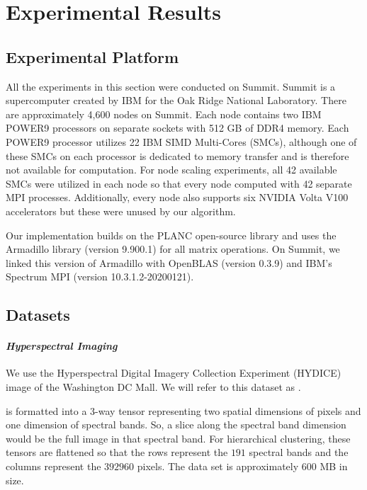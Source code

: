 
\section{Experimental Results}
\label{sec:results}

\subsection{Experimental Platform}
\label{sec:summit}

All the experiments in this section were conducted on Summit. Summit is a supercomputer created by IBM for the Oak Ridge National Laboratory. 
There are approximately 4,600 nodes on Summit. 
Each node contains two IBM POWER9 processors on separate sockets with 512 GB of DDR4 memory.
Each POWER9 processor utilizes 22 IBM SIMD Multi-Cores (SMCs), although one of these SMCs on each processor is dedicated to memory transfer and is therefore not available for computation. 
For node scaling experiments, all 42 available SMCs were utilized in each node so that every node computed with 42 separate MPI processes.
Additionally, every node also supports six NVIDIA Volta V100 accelerators but these were unused by our algorithm. 

Our implementation builds on the PLANC open-source library \cite{EH+19-TR} and uses the Armadillo library (version 9.900.1) for all matrix operations. 
On Summit, we linked this version of Armadillo with OpenBLAS (version 0.3.9) and IBM's Spectrum MPI (version 10.3.1.2-20200121).

\subsection{Datasets}

\paragraph{\emph{Hyperspectral Imaging}}

	We use the Hyperspectral Digital Imagery Collection Experiment (HYDICE) image of the Washington DC Mall. We will refer
	to this dataset as \hyper{}\cite{DC-HYDICE}.
	
	\hyper{} is formatted into a 3-way tensor representing two spatial dimensions of pixels and one dimension of spectral bands. So, a slice along
	the spectral band dimension would be the full \hyper{} image in that spectral band. For hierarchical clustering, these tensors are flattened so that the rows represent the
	$191$ spectral bands and the columns represent the $392960$ pixels.   The data set is approximately 600 MB in size.


